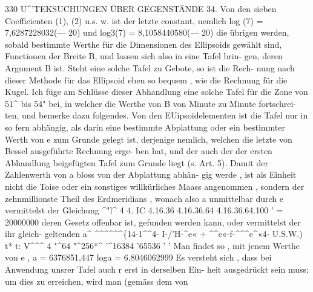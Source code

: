 \documentclass[12pt,a4paper]{article}
\begin{document}
330  U\^{}'TEKSUCHUNGEN  ÜBER  GEGENSTÄNDE 34. Von  den  sieben  Coefficienten  (1),  (2)  u.s.  w.  ist  der  letzte  constant,  nemlich log    (7)  =  7,6287228032(--- 20) und  log3(7)  =  8,1058440580(--- 20) die  übrigen  werden,  sobald  bestimmte  Werthe  für  die  Dimensionen  des  Ellipsoids gewählt  sind,  Functionen  der  Breite  B,  und  lassen  sich  also  in  eine  Tafel  brin- gen, deren  Argument  B  ist.  Steht  eine  solche  Tafel  zu  Gebote,  so  ist  die  Rech- nung nach  dieser  Methode  für  das  Ellipsoid  eben  so  bequem ,  wie  die  Rechnung für  die  Kugel. Ich  füge  am  Schlüsse  dieser  Abhandlung  eine  solche  Tafel  für  die  Zone  von 51\^{}  bis  54"  bei,  in  welcher  die  Werthe  von  B  von  Minute  zu  Minute  fortschrei- ten, und  bemerke  dazu  folgendes. Von  den  EUipsoidelementen  ist  die  Tafel  nur  in  so  fern  abhängig,  als  darin eine  bestimmte  Abplattung  oder  ein  bestimmter  Werth  von  e  zum  Grunde  gelegt ist,  derjenige  nemlich,  welchen  die  letzte  von  Bessel  ausgeführte  Rechnung  erge- ben hat,  und  der  auch  der  der  ersten  Abhandlung  beigefügten  Tafel  zum  Grunde liegt  (s.  Art.  5).  Damit  der  Zahlenwerth  von  a  bloss  von  der  Abplattung  abhän- gig werde ,  ist  als  Einheit  nicht  die  Toise  oder  ein  sonstiges  willkürliches  Maass angenommen ,  sondern  der  zehnmillionste  Theil  des  Erdmeridians ,  wonach  also a  unmittelbar  durch  e  vermittelst  der  Gleichung \^{}"l\^{}  4  4.  IC  4.16.36  4.16.36.64  4.16.36.64.100  ' =  20000000 deren  Gesetz  offenbar  ist,  gefunden  werden  kann,  oder  vermittelst  der  ihr  gleich- geltenden a\^{}  \^{}\^{}\^{}\^{}\^{}\^{}\{14-1\^{}\^{}4- I-/'H-\^{}e«  +  \^{}\^{}e«-f-\^{}\^{}\^{}e\^{}«4- U.S.W.) t*    t:  V\^{}\^{}\^{}   4  "\^{}64  "\^{}256*\^{}       '\^{}16384  '65536  '  ' Man  findet  so ,  mit  jenem  Werthe  von  e , a  =  6376851,447 loga  =  6,8046062999 Es  versteht  sich ,  dass  bei  Anwendung  unsrer  Tafel  auch  r  erst  in  derselben  Ein- heit ausgedrückt  sein  muss;  um  dies  zu  erreichen,  wird  man  (gemäss  dem  von
\end{document}
